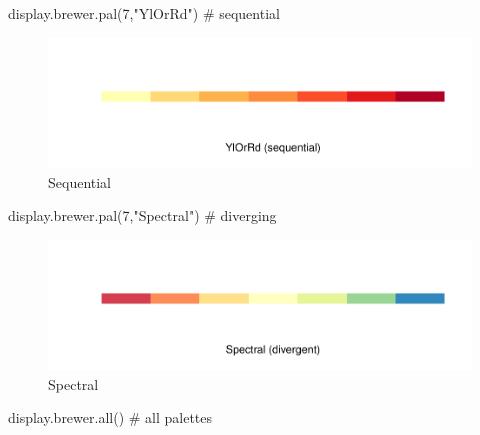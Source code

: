 \documentclass[
]{article}
\newenvironment{Shaded}{}{}
\newcommand{\CommentTok}[1]{\textcolor[rgb]{0.00,0.50,0.00}{#1}}
\newcommand{\DecValTok}[1]{#1}
\newcommand{\FunctionTok}[1]{#1}
\newcommand{\NormalTok}[1]{#1}
\newcommand{\StringTok}[1]{\textcolor[rgb]{0.00,0.50,0.50}{#1}}
\begin{document}
\begin{Shaded}
\begin{Highlighting}[]
\FunctionTok{display.brewer.pal}\NormalTok{(}\DecValTok{7}\NormalTok{,}\StringTok{"YlOrRd"}\NormalTok{) }\CommentTok{\# sequential}
\end{Highlighting}
\end{Shaded}

\begin{figure}
\centering
\includegraphics{design_files/figure-latex/unnamed-chunk-5-1.pdf}
\caption{Sequential}
\end{figure}

\begin{Shaded}
\begin{Highlighting}[]
\FunctionTok{display.brewer.pal}\NormalTok{(}\DecValTok{7}\NormalTok{,}\StringTok{"Spectral"}\NormalTok{) }\CommentTok{\# diverging}
\end{Highlighting}
\end{Shaded}

\begin{figure}
\centering
\includegraphics{design_files/figure-latex/unnamed-chunk-6-1.pdf}
\caption{Spectral}
\end{figure}

\begin{Shaded}
\begin{Highlighting}[]
\FunctionTok{display.brewer.all}\NormalTok{() }\CommentTok{\# all palettes}
\end{Highlighting}
\end{Shaded}
\end{document}
